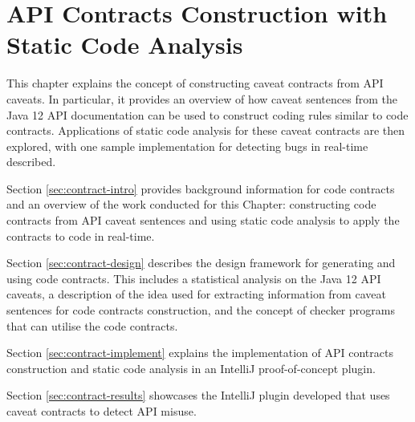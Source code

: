 \chapter{API Contracts Construction with Static Code Analysis}
\label{cha:codeAnalysis}
This chapter explains the concept of constructing caveat contracts from API caveats. In particular, it provides an overview of how caveat sentences from the Java 12 API documentation can be used to construct coding rules similar to code contracts. Applications of static code analysis for these caveat contracts are then explored, with one sample implementation for detecting bugs in real-time described.\bigbreak

\noindent
Section \ref{sec:contract-intro} provides background information for code contracts and an overview of the work conducted for this Chapter: constructing code contracts from API caveat sentences and using static code analysis to apply the contracts to code in real-time. \bigbreak

\noindent
Section \ref{sec:contract-design} describes the design framework for generating and using code contracts. This includes a statistical analysis on the Java 12 API caveats, a description of the idea used for extracting information from caveat sentences for code contracts construction, and the concept of checker programs that can utilise the code contracts. \bigbreak

\noindent
Section \ref{sec:contract-implement} explains the implementation of API contracts construction and static code analysis in an IntelliJ proof-of-concept plugin. \bigbreak

\noindent
Section \ref{sec:contract-results} showcases the IntelliJ plugin developed that uses caveat contracts to detect API misuse. \bigbreak

